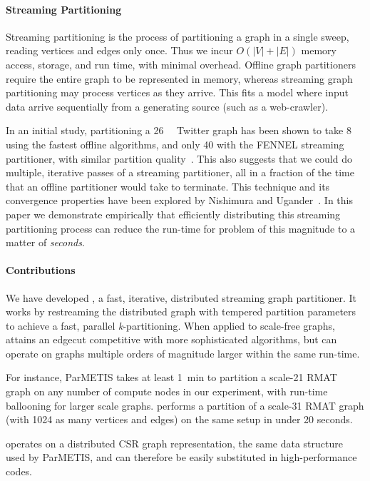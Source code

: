 \paragraph{Streaming Partitioning}
Streaming partitioning is the process of partitioning a graph in a single sweep, reading vertices and edges only once. Thus we incur $O(|V| + |E|)$ memory access, storage, and run time, with minimal overhead. Offline graph partitioners require the entire graph to be represented in memory, whereas streaming graph partitioning may process vertices as they arrive. This fits a model where input data arrive sequentially from a generating source (such as a web-crawler).

In an initial study, partitioning a \SI{26}{\giga\byte} Twitter graph has been shown to take \SI[abbreviations=false]{8}{\hours} using the fastest offline algorithms, and only \SI{40}{\minutes} with the FENNEL streaming partitioner, with similar partition quality~\cite{tsourakakis2012fennel}. This also suggests that we could do multiple, iterative passes of a streaming partitioner, all in a fraction of the time that an offline partitioner would take to terminate. This technique and its convergence properties have been explored by Nishimura and Ugander~\cite{nishimura2013restream}. In this paper we demonstrate empirically that efficiently distributing this streaming partitioning process can reduce the run-time for problem of this magnitude to a matter of \emph{seconds}. 

\paragraph{Contributions}
We have developed \ourmethod, a fast, iterative, distributed streaming graph partitioner.
It works by restreaming the distributed graph with tempered partition parameters to achieve a fast, parallel \textit{k}-partitioning. When applied to scale-free graphs, \ourmethod attains an edgecut competitive with more sophisticated algorithms, but can operate on graphs multiple orders of magnitude larger within the same run-time. 

For instance, ParMETIS takes at least \SI{1}{\minute} to partition a scale-21 RMAT graph on any number of compute nodes in our experiment, with run-time ballooning for larger scale graphs. \ourmethod performs a partition of a scale-31 RMAT graph (with 1024 as many vertices and edges) on the same setup in under 20 seconds.

\ourmethod operates on a distributed CSR graph representation, the same data structure used by ParMETIS, and can therefore be easily substituted in high-performance codes. 

